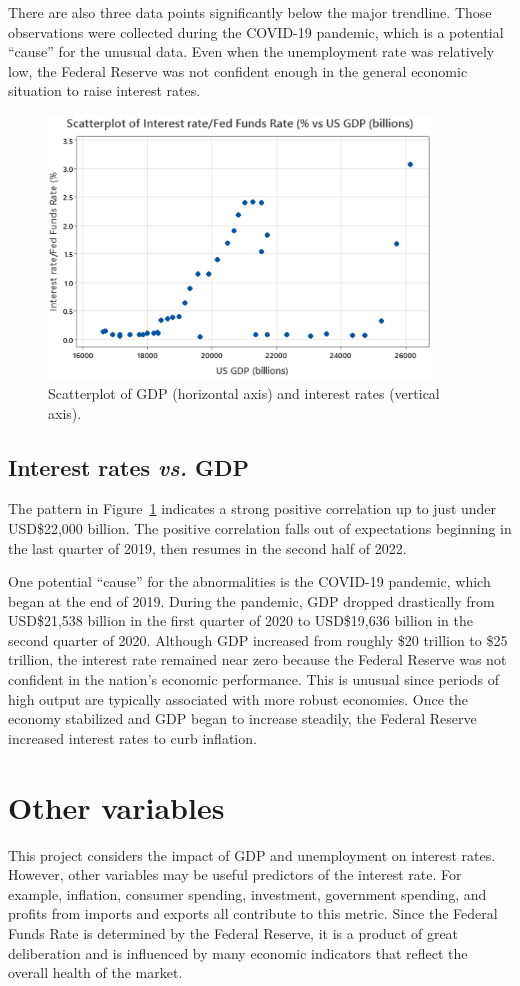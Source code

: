 \documentclass[12pt]{article}
\begin{document}
There are also three data points significantly below the major trendline. Those observations were collected during the COVID-19 pandemic, which is a potential ``cause'' for the unusual data. Even when the unemployment rate was relatively low, the Federal Reserve was not confident enough in the general economic situation to raise interest rates.
\begin{figure}[ht]
\begin{center}
\includegraphics[width=4in]{images/gdp-scatterplot.png}
\end{center}
\caption{Scatterplot of GDP (horizontal axis) and interest rates (vertical axis).
\label{fig:gdpscatterplot}}
\end{figure}
\subsection{Interest rates \emph{vs.} GDP}
The pattern in Figure~\ref{fig:gdpscatterplot} indicates a strong positive correlation up to just under USD\$22,000 billion. The positive correlation falls out of expectations beginning in the last quarter of 2019, then resumes in the second half of 2022.

One potential ``cause'' for the abnormalities is the COVID-19 pandemic, which began at the end of 2019. During the pandemic, GDP dropped drastically from USD\$21,538 billion in the first quarter of 2020 to USD\$19,636 billion in the second quarter of 2020. Although GDP increased from roughly \$20 trillion to \$25 trillion, the interest rate remained near zero because the Federal Reserve was not confident in the nation's economic performance. This is unusual since periods of high output are typically associated with more robust economies. Once the economy stabilized and GDP began to increase steadily, the Federal Reserve increased interest rates to curb inflation. 
\section{Other variables}
This project considers the impact of GDP and unemployment on interest rates. However, other variables may be useful predictors of the interest rate. For example, inflation, consumer spending, investment, government spending, and profits from imports and exports all contribute to this metric. Since the Federal Funds Rate is determined by the Federal Reserve, it is a product of great deliberation and is influenced by many economic indicators that reflect the overall health of the market.
\end{document}
